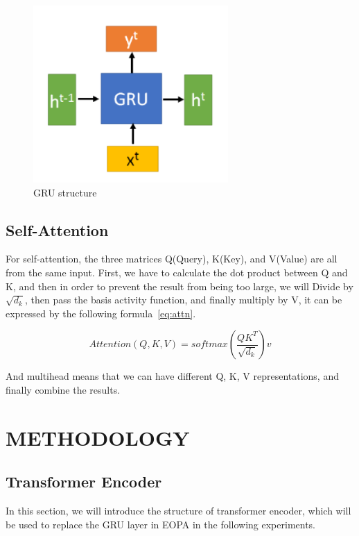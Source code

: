 \documentclass{article}
\begin{document}
\begin{figure}
    \centering
    \includegraphics[scale=0.6]{gru}
    \caption{GRU structure}
    \label{fig:gru}
\end{figure}

\subsection{Self-Attention}

For self-attention, the three matrices Q(Query), K(Key), and V(Value) are
all from the same input. First, we have to calculate the dot product
between Q and K, and then in order to prevent the result
from being too large, we will Divide by $\sqrt{d_k}$,
then pass the basis activity function, and finally multiply by V,
it can be expressed by the following formula~\ref{eq:attn}.

\begin{equation}
    \label{eq:attn}
    Attention(Q,K,V)=softmax(\frac{QK^{T}}{\sqrt{d_{k}}})v
\end{equation}

And multihead means that we can have different Q, K, V representations,
and finally combine the results.


\section{METHODOLOGY}

\subsection{Transformer Encoder}

In this section, we will introduce the structure of transformer encoder,
which will be used to replace the GRU layer in EOPA
in the following experiments.
\end{document}
